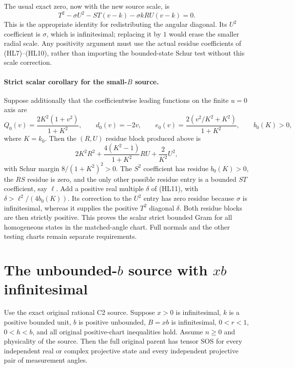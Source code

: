 The usual exact zero, now with the new source scale, is
\[
 T^2-\sigma U^2-ST(v-k)-\sigma kRU(v-k)=0.          \tag{HL11}
\]
This is the appropriate identity for redistributing the angular
diagonal.  Its $U^2$ coefficient is $\sigma$, which is infinitesimal;
replacing it by $1$ would erase the smaller radial scale.  Any
positivity argument must use the actual residue coefficients of
(HL7)--(HL10), rather than importing the bounded-state Schur test
without this scale correction.

\paragraph{Strict scalar corollary for the small-$B$ source.}
Suppose additionally that the coefficientwise leading functions on
the finite $u=0$ axis are
\[
 Q_0(v)=\frac{2K^2(1+v^2)}{1+K^2},\qquad
 d_0(v)=-2v,\qquad
 e_0(v)=\frac{2(v^2/K^2+K^2)}{1+K^2},
 \qquad b_0(K)>0,
\]
where $K=k_0$.  Then the $(R,U)$ residue block produced above is
\[
 2K^2R^2+\frac{4(K^2-1)}{1+K^2}RU+\frac2{K^2}U^2,
\]
with Schur margin $8/(1+K^2)^2>0$.  The $S^2$ coefficient has
residue $b_0(K)>0$, the $RS$ residue is zero, and the only other
possible residue entry is a bounded $ST$ coefficient, say $\ell$.
Add a positive real multiple $\delta$ of (HL11), with
$\delta>\ell^2/(4b_0(K))$.  Its correction to the $U^2$ entry has
zero residue because $\sigma$ is infinitesimal, whereas it supplies
the positive $T^2$ diagonal $\delta$.  Both residue blocks are then
strictly positive.  This proves the scalar strict bounded Gram for
all homogeneous states in the matched-angle chart.  Full normals
and the other testing charts remain separate requirements.


\section{\texorpdfstring{The unbounded-$b$ source with $xb$ infinitesimal}{The unbounded-b source with xb infinitesimal}}
\label{component:pab6222b899ef}

\label{pab6222b899ef:sec:c2-unbounded-b-small-B}

\begin{theorem}
Use the exact original rational C2 source.  Suppose $x>0$ is
infinitesimal, $k$ is a positive bounded unit, $b$ is positive
unbounded, $B=xb$ is infinitesimal, $0<r<1$, $0<h<b$, and all
original positive-chart inequalities hold.  Assume $n\geq0$ and
physicality of the source.  Then the full original parent has tensor
SOS for every independent real or complex projective state and
every independent projective pair of measurement angles.
\end{theorem}

